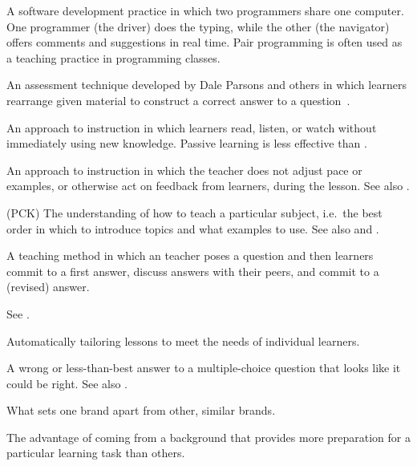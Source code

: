 \begin{description}
 A software development practice in
which two programmers share one computer. One programmer (the driver) does the
typing, while the other (the navigator) offers comments and suggestions in real
time. Pair programming is often used as a teaching practice in programming
classes.

 An assessment technique developed by
Dale Parsons and others in which learners rearrange given material to construct
a correct answer to a question~\cite{Pars2006}.

 An approach to instruction in which
learners read, listen, or watch without immediately using new knowledge.
Passive learning is less effective than .

 An approach to instruction in which
the teacher does not adjust pace or examples, or otherwise act on feedback from
learners, during the lesson.  See also .

 (PCK)
The understanding of how to teach a particular subject, i.e.\ the best order in
which to introduce topics and what examples to use. See also
and .

 A teaching method in which an
teacher poses a question and then learners commit to a first answer, discuss
answers with their peers, and commit to a (revised) answer.

 See .

 Automatically tailoring
lessons to meet the needs of individual learners.

 A wrong or less-than-best
answer to a multiple-choice question that looks like it could be right. See also
.

 What sets one brand apart from other,
similar brands.

 The advantage of coming
from a background that provides more preparation for a particular learning task
than others.


\end{description}
